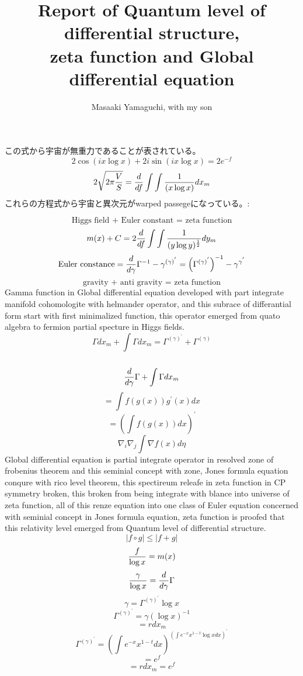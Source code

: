 \documentclass{jsarticle}
\begin{document}
{  この式から宇宙が無重力であることが表されている。
  $$ 2 \cos (i x \log x) + 2 i \sin(i x \log x) = 2 e^{-f} $$
  $$ 2 \sqrt{2 \pi {V \over S}} = {d \over df} 
  \int \int{1 \over (x \log x)}dx_m$$
  これらの方程式から宇宙と異次元がwarped passegeになっている。:

\newpage
\title{Report of Quantum level of differential structure, \\
zeta function and Global differential equation}
\author{Masaaki Yamaguchi, with my son}

  $$ \text{Higgs field + Euler constant = zeta function} $$
  $$ m(x) + C = 2 {d \over df}\int\int {1 \over (y \log y)^{1 \over 2}}dy_m$$
  $$ \text{Euler constance} = {d \over d \gamma}\Gamma^{-1} - \gamma^{(\gamma)
  ^{'}} = {\left(\Gamma^{(\gamma)^{'}}\right)}^{-1} - \gamma^{\gamma^{'}} $$
  $$ \text{gravity + anti gravity = zeta function} $$
  Gamma function in Global differential equation developed with part integrate
  manifold cohomologite with helmander operator, and this subrace of 
  differantial form start with first minimalized function, this operator
  emerged from quato algebra to fermion partial specture in Higgs fields.
  $$ \Gamma dx_m + \int \Gamma dx_m = \Gamma^{(\gamma)^{'}} + \Gamma^{(
  \gamma)} $$　
  $$ {d \over d \gamma}\Gamma + \int \Gamma dx_m $$
  $$ = \int f(g(x))g^{'}(x)dx $$
  $$ = \left(\int f(g(x))dx\right)^{'} $$
  $$ \nabla_i \nabla_j \int \nabla f(x) d \eta $$
  Global differential equation is partial integrate operator in resolved
  zone of frobenius theorem and this seminial concept with zone,
  Jones formula equation conqure with rico level theorem,
  this spectireum releafe in zeta function in CP symmetry broken,
  this broken from being integrate with blance into universe of zeta function,
  all of this renze equation into one class of Euler equation concerned with
  seminial concept in Jones formula equation, 
  zeta function is proofed that this relativity level 
  emerged from Quantum level of differential structure.
    $$ |f \circ g| \le |f + g| $$
  $$ {f \over \log x} = m(x) $$
  $$ {\gamma \over \log x} = {d \over d \gamma}\Gamma $$
  $$ \gamma = \Gamma^{(\gamma)^{'}}\log x$$
  $$ \Gamma^{(\gamma)^{'}} = \gamma (\log x)^{-1} $$
  $$ = r dx_m $$
  $$ \Gamma^{(\gamma)^{'}} = \left(\int e^{-x}x^{1 - t}dx\right)^{
	  \left(\int e^{-x}x^{1 - t} \log x dx\right)^{'}} $$
  $$ = e^{f} $$
  $$ = r dx_m = e^{f} $$
 
}
\end{document}
